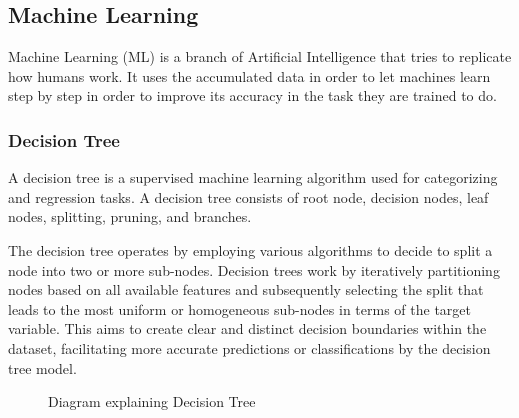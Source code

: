 \documentclass[12pt,oneside,openright,a4paper]{cpe-english-project}
\begin{document}
    \subsection{Machine Learning}
      \qquad Machine Learning (ML) is a branch of Artificial Intelligence that tries to replicate how humans work. It uses the accumulated data in order to let machines learn step by step in order to improve its accuracy in the task they are trained to do.\par
        
        \subsubsection{Decision Tree}
          \qquad A decision tree is a supervised machine learning algorithm used for categorizing and regression tasks. A decision tree consists of root node, decision nodes, leaf nodes, splitting, pruning, and branches.\par
          \qquad The decision tree operates by employing various algorithms to decide to split a node into two or more sub-nodes. Decision trees work by iteratively partitioning nodes based on all available features and subsequently selecting the split that leads to the most uniform or homogeneous sub-nodes in terms of the target variable. This aims to create clear and distinct decision boundaries within the dataset, facilitating more accurate predictions or classifications by the decision tree model.\par
          \begin{figure}[!h]
            \centering
            \caption{Diagram explaining Decision Tree}\label{fig:Decision_Tree}
          \end{figure}
        
\end{document}
